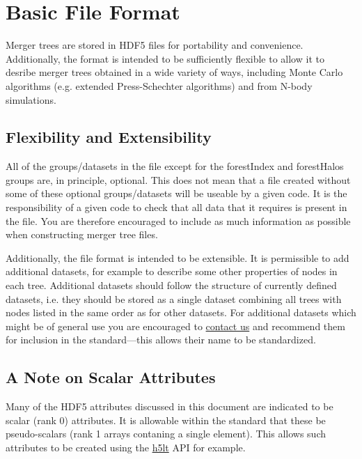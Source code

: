 \section{Basic File Format}\label{sec:MergerTreeFormatDescription}

Merger trees are stored in HDF5 files for portability and convenience. Additionally, the format is intended to be sufficiently flexible to allow it to desribe merger trees obtained in a wide variety of ways, including Monte Carlo algorithms (e.g. extended Press-Schechter algorithms) and from N-body simulations. 

\subsection{Flexibility and Extensibility}

All of the groups/datasets in the file except for the {\normalfont \ttfamily forestIndex} and {\normalfont \ttfamily forestHalos} groups are, in principle, optional. This does not mean that a file created without some of these optional groups/datasets will be useable by a given code. It is the responsibility of a given code to check that all data that it requires is present in the file. You are therefore encouraged to include as much information as possible when constructing merger tree files.

Additionally, the file format is intended to be extensible. It is permissible to add additional datasets, for example to describe some other properties of nodes in each tree. Additional datasets should follow the structure of currently defined datasets, i.e. they should be stored as a single dataset combining all trees with nodes listed in the same order as for other datasets. For additional datasets which might be of general use you are encouraged to \href{mailto:abenson@carnegiescience.edu}{contact us} and recommend them for inclusion in the standard---this allows their name to be standardized.

\subsection{A Note on Scalar Attributes}

Many of the HDF5 attributes discussed in this document are indicated to be scalar (rank 0) attributes. It is allowable within the standard that these be pseudo-scalars (rank 1 arrays contaning a single element). This allows such attributes to be created using the \href{http://www.hdfgroup.org/HDF5/doc/HL/RM_H5LT.html}{\normalfont \ttfamily h5lt} API for example.

